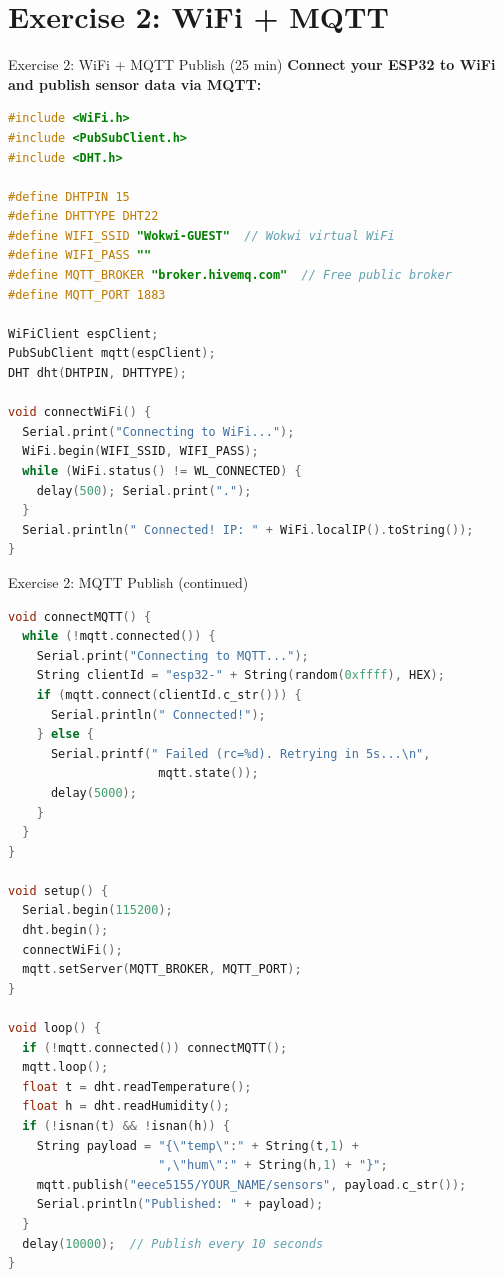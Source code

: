 \documentclass[aspectratio=169,11pt]{beamer}
\begin{document}
\section{Exercise 2: WiFi + MQTT}

\begin{frame}[fragile]{Exercise 2: WiFi + MQTT Publish (25 min)}
    \textbf{Connect your ESP32 to WiFi and publish sensor data via MQTT:}

    \vspace{0.1cm}
    \begin{lstlisting}[language=C]
#include <WiFi.h>
#include <PubSubClient.h>
#include <DHT.h>

#define DHTPIN 15
#define DHTTYPE DHT22
#define WIFI_SSID "Wokwi-GUEST"  // Wokwi virtual WiFi
#define WIFI_PASS ""
#define MQTT_BROKER "broker.hivemq.com"  // Free public broker
#define MQTT_PORT 1883

WiFiClient espClient;
PubSubClient mqtt(espClient);
DHT dht(DHTPIN, DHTTYPE);

void connectWiFi() {
  Serial.print("Connecting to WiFi...");
  WiFi.begin(WIFI_SSID, WIFI_PASS);
  while (WiFi.status() != WL_CONNECTED) {
    delay(500); Serial.print(".");
  }
  Serial.println(" Connected! IP: " + WiFi.localIP().toString());
}
    \end{lstlisting}
\end{frame}

\begin{frame}[fragile]{Exercise 2: MQTT Publish (continued)}
    \begin{lstlisting}[language=C]
void connectMQTT() {
  while (!mqtt.connected()) {
    Serial.print("Connecting to MQTT...");
    String clientId = "esp32-" + String(random(0xffff), HEX);
    if (mqtt.connect(clientId.c_str())) {
      Serial.println(" Connected!");
    } else {
      Serial.printf(" Failed (rc=%d). Retrying in 5s...\n",
                     mqtt.state());
      delay(5000);
    }
  }
}

void setup() {
  Serial.begin(115200);
  dht.begin();
  connectWiFi();
  mqtt.setServer(MQTT_BROKER, MQTT_PORT);
}

void loop() {
  if (!mqtt.connected()) connectMQTT();
  mqtt.loop();
  float t = dht.readTemperature();
  float h = dht.readHumidity();
  if (!isnan(t) && !isnan(h)) {
    String payload = "{\"temp\":" + String(t,1) +
                     ",\"hum\":" + String(h,1) + "}";
    mqtt.publish("eece5155/YOUR_NAME/sensors", payload.c_str());
    Serial.println("Published: " + payload);
  }
  delay(10000);  // Publish every 10 seconds
}
    \end{lstlisting}
\end{frame}
\end{document}
